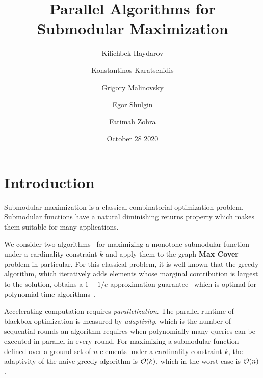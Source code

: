 \documentclass[11pt, a4paper]{article}
\title{Parallel Algorithms for Submodular Maximization}
\author{Kilichbek Haydarov \and Konstantinos Karatsenidis \and Grigory Malinovsky \and Egor Shulgin \and Fatimah Zohra}
\date{October 28 2020}
\begin{document}
\maketitle

\section{Introduction}
Submodular maximization is a classical combinatorial optimization problem. Submodular functions have a natural diminishing returns property which makes them suitable for many applications. 

We consider two algorithms~\cite{chekuri2018submodular, breuer2019fast} for maximizing a monotone submodular function under a cardinality constraint $k$ and apply them to the graph \textbf{Max Cover} problem in particular.
For this classical problem, it is well known that the greedy algorithm, which iteratively adds elements whose marginal contribution is largest to the solution, obtains a $1-1/e$ approximation guarantee~\cite{NWF78} which is optimal for polynomial-time algorithms~\cite{nemhauser1978best}.

Accelerating computation 
requires \emph{parallelization}.  The parallel runtime of blackbox optimization is measured by \emph{adaptivity}, which is the number of sequential rounds an algorithm requires when polynomially-many queries can be executed in parallel in every round.  For maximizing a submodular function defined over a ground set of $n$ elements under a cardinality constraint $k$, the adaptivity of the naive greedy algorithm is ${\cal O}(k)$, which in the worst case is ${\cal O}(n)$.  
\end{document}
